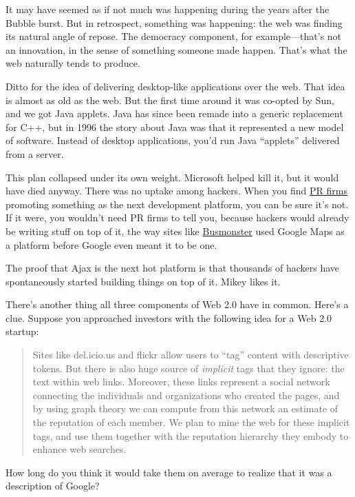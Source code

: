 \documentclass[12pt]{book}
\begin{document}
It may have seemed as if not much was happening during the years after
the Bubble burst. But in retrospect, something was happening: the web
was finding its natural angle of repose. The democracy component, for
example---that's not an innovation, in the sense of something someone
made happen. That's what the web naturally tends to produce.

Ditto for the idea of delivering desktop-like applications over the web.
That idea is almost as old as the web. But the first time around it was
co-opted by Sun, and we got Java applets. Java has since been remade
into a generic replacement for C++, but in 1996 the story about Java was
that it represented a new model of software. Instead of desktop
applications, you'd run Java ``applets'' delivered from a server.

This plan collapsed under its own weight. Microsoft helped kill it, but
it would have died anyway. There was no uptake among hackers. When you
find \href{submarine.html}{PR firms} promoting something as the next
development platform, you can be sure it's not. If it were, you wouldn't
need PR firms to tell you, because hackers would already be writing
stuff on top of it, the way sites like
\href{http://busmonster.com}{Busmonster} used Google Maps as a platform
before Google even meant it to be one.

The proof that Ajax is the next hot platform is that thousands of
hackers have spontaneously started building things on top of it. Mikey
likes it.

There's another thing all three components of Web 2.0 have in common.
Here's a clue. Suppose you approached investors with the following idea
for a Web 2.0 startup:

\begin{quote}
Sites like del.icio.us and flickr allow users to ``tag'' content with
descriptive tokens. But there is also huge source of \emph{implicit}
tags that they ignore: the text within web links. Moreover, these links
represent a social network connecting the individuals and organizations
who created the pages, and by using graph theory we can compute from
this network an estimate of the reputation of each member. We plan to
mine the web for these implicit tags, and use them together with the
reputation hierarchy they embody to enhance web searches.
\end{quote}

How long do you think it would take them on average to realize that it
was a description of Google?
\end{document}
